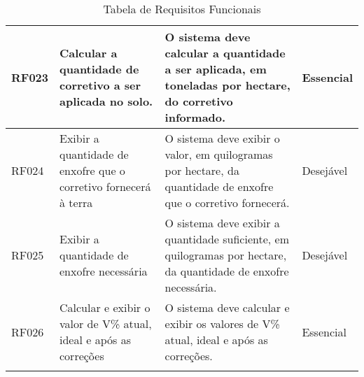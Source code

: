 \begin{landscape}
\begin{longtable}{|p{1.5cm}|p{5cm}|p{9cm}|p{2.5cm}|}
    RF023 & Calcular a quantidade de corretivo a ser aplicada no solo.                       & O sistema deve calcular a quantidade a ser aplicada, em toneladas por hectare, do corretivo informado.                                                                                                                                                                                                  & Essencial  \\\hline
    RF024 & Exibir a quantidade de enxofre que o corretivo fornecerá à terra                 & O sistema deve exibir o valor, em quilogramas por hectare, da quantidade de enxofre que o corretivo fornecerá.                                                                                                                                                                                          & Desejável  \\\hline
    RF025 & Exibir a quantidade de enxofre necessária                                        & O sistema deve exibir a quantidade suficiente, em quilogramas por hectare, da quantidade de enxofre necessária.                                                                                                                                                                                         & Desejável  \\\hline
    RF026 & Calcular e exibir o valor de V\% atual, ideal e após as correções                & O sistema deve calcular e exibir os valores de V\% atual, ideal e após as correções.                                                                                                                                                                                                                    & Essencial  \\\hline
    \caption{Tabela de Requisitos Funcionais}
    \label{rf:tabela}
\end{longtable}
\end{landscape}
